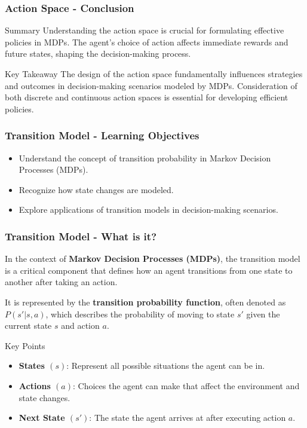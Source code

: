 \documentclass[aspectratio=169]{beamer}
\begin{document}
\begin{frame}[fragile]
    \frametitle{Action Space - Conclusion}
    \begin{block}{Summary}
        Understanding the action space is crucial for formulating effective policies in MDPs. The agent's choice of action affects immediate rewards and future states, shaping the decision-making process.
    \end{block}

    \begin{block}{Key Takeaway}
        The design of the action space fundamentally influences strategies and outcomes in decision-making scenarios modeled by MDPs. Consideration of both discrete and continuous action spaces is essential for developing efficient policies.
    \end{block}
\end{frame}

\begin{frame}[fragile]
    \frametitle{Transition Model - Learning Objectives}
    \begin{itemize}
        \item Understand the concept of transition probability in Markov Decision Processes (MDPs).
        \item Recognize how state changes are modeled.
        \item Explore applications of transition models in decision-making scenarios.
    \end{itemize}
\end{frame}

\begin{frame}[fragile]
    \frametitle{Transition Model - What is it?}
    In the context of \textbf{Markov Decision Processes (MDPs)}, the transition model is a critical component that defines how an agent transitions from one state to another after taking an action. 

    It is represented by the \textbf{transition probability function}, often denoted as \( P(s' | s, a) \), which describes the probability of moving to state \( s' \) given the current state \( s \) and action \( a \).
    
    \begin{block}{Key Points}
        \begin{itemize}
            \item \textbf{States \( (s) \)}: Represent all possible situations the agent can be in.
            \item \textbf{Actions \( (a) \)}: Choices the agent can make that affect the environment and state changes.
            \item \textbf{Next State \( (s') \)}: The state the agent arrives at after executing action \( a \).
        \end{itemize}
    \end{block}
\end{frame}
\end{document}
